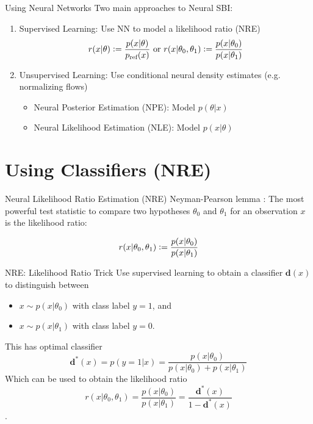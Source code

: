 \documentclass[12pt, aspectratio=169]{beamer}
\let\olditem\item
\renewcommand\item{\olditem\justifying}
\begin{document}
\begin{frame}{Using Neural Networks}
    Two main approaches to Neural SBI:
    \begin{enumerate}
        \item Supervised Learning: Use NN to model a likelihood ratio (NRE)
        $$r(x | \theta) \vcentcolon= \frac{p(x|\theta)}{p_{\text{ref}}(x)} \text{ or } r(x | \theta_0, \theta_1) \vcentcolon = \frac{p(x|\theta_0)}{p(x|\theta_1)}$$
        
        \pause
        \item Unsupervised Learning: Use conditional neural density estimates (e.g. normalizing flows)
        \begin{itemize}
            \item Neural Posterior Estimation (NPE): Model $p(\theta | x)$
            \item Neural Likelihood Estimation (NLE): Model $p(x|\theta)$
        \end{itemize}
    \end{enumerate}
\end{frame}

\section{Using Classifiers (NRE)}
\begin{frame}{Neural Likelihood Ratio Estimation (NRE)}
    \alert{Neyman-Pearson lemma} \parencite{neyman_ix_1933}: The most powerful test statistic to compare two hypotheses $\theta_0$ and $\theta_1$ for an observation $x$ is the likelihood ratio:

    $$r(x | \theta_0, \theta_1) \vcentcolon=\frac{p(x|\theta_0)}{p(x|\theta_1)}$$
    
\end{frame}

\begin{frame}{NRE: Likelihood Ratio Trick}
    Use supervised learning to obtain a classifier $\mathbf{d}(x)$ to distinguish between
    \begin{itemize}
        \item $x \sim p (x | \theta_0)$ with class label $y=1$, and
        \item $x \sim p (x | \theta_1)$ with class label $y=0$.
    \end{itemize}

    \pause 
    This has optimal classifier
    $$\mathbf{d}^*(x) = p(y=1 | x) = \frac{p(x|\theta_0)}{p(x|\theta_0) + p(x|\theta_1)}$$
    \pause 
    Which can be used to obtain the likelihood ratio
    $$r(x|\theta_0, \theta_1) = \frac{p(x|\theta_0)}{p(x|\theta_1)} = \frac{\mathbf{d}^* (x)}{1-\mathbf{d}^*(x)}$$.
\end{frame}
\end{document}
